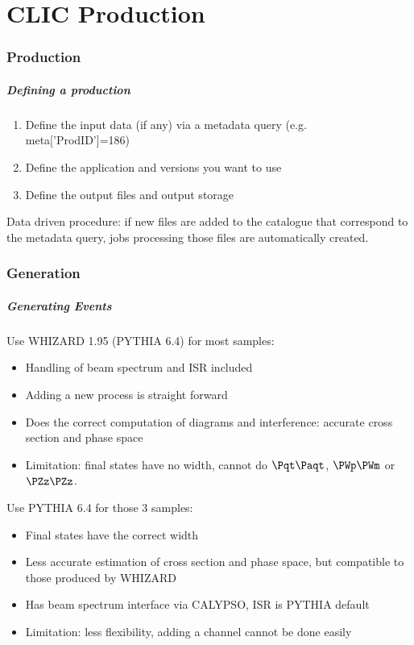 \documentclass{beamer}
\begin{document}
\part{CLIC Production}
\begin{frame}
\partpage 
\end{frame}

\section{Production}
\begin{frame}
\frametitle{Defining a production} 
\begin{enumerate}
\item Define the input data (if any) via a metadata query (e.g. meta['ProdID']=186)
\item Define the application and versions you want to use
\item Define the output files and output storage
\end{enumerate}
\alert{Data driven procedure}: if new files are added to the catalogue that correspond to the metadata query, jobs processing those files are automatically created.
\end{frame}


\section{Generation}
\begin{frame}
\frametitle{Generating Events}
Use WHIZARD 1.95 (PYTHIA 6.4) for most samples:
\begin{itemize}
\item Handling of \alert{beam spectrum and ISR included}
\item Adding a \alert{new process} is straight forward
\item Does the correct computation of diagrams and interference: \alert{accurate cross section and phase space}
\item Limitation: \alert{final states have no width}, cannot do $\Pqt\Paqt$, $\PWp\PWm$ or $\PZz\PZz$.
\end{itemize} 
Use PYTHIA 6.4 for those 3 samples:
\begin{itemize}
\item Final states have the correct width
\item Less accurate estimation of cross section and phase space, but compatible to those produced by WHIZARD
\item Has \alert{beam spectrum interface via CALYPSO}, ISR is PYTHIA default
\item Limitation: \alert{less flexibility}, adding a channel cannot be done easily
\end{itemize}
\end{frame}
\end{document}
